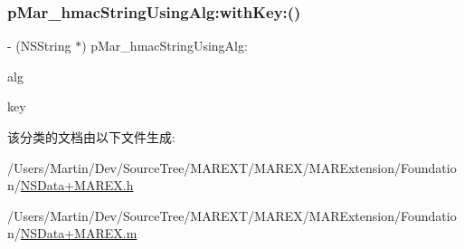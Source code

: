 \mbox{\label{category_n_s_data_07_m_a_r_e_x_08_afd229151be0a700e48125efc2e7eb34c}} 
\subsubsection{\texorpdfstring{p\+Mar\+\_\+hmac\+String\+Using\+Alg\+:with\+Key\+:()}{pMar\_hmacStringUsingAlg:withKey:()}}
{\footnotesize\ttfamily -\/ (N\+S\+String $\ast$) p\+Mar\+\_\+hmac\+String\+Using\+Alg\+: \begin{DoxyParamCaption}\item[{(C\+C\+Hmac\+Algorithm)}]{alg }\item[{withKey:(N\+S\+String $\ast$)}]{key }\end{DoxyParamCaption}\hspace{0.3cm}{\ttfamily [implementation]}}



该分类的文档由以下文件生成\+:\begin{DoxyCompactItemize}
\item 
/\+Users/\+Martin/\+Dev/\+Source\+Tree/\+M\+A\+R\+E\+X\+T/\+M\+A\+R\+E\+X/\+M\+A\+R\+Extension/\+Foundation/\hyperlink{_n_s_data_09_m_a_r_e_x_8h}{N\+S\+Data+\+M\+A\+R\+E\+X.\+h}\item 
/\+Users/\+Martin/\+Dev/\+Source\+Tree/\+M\+A\+R\+E\+X\+T/\+M\+A\+R\+E\+X/\+M\+A\+R\+Extension/\+Foundation/\hyperlink{_n_s_data_09_m_a_r_e_x_8m}{N\+S\+Data+\+M\+A\+R\+E\+X.\+m}\end{DoxyCompactItemize}
